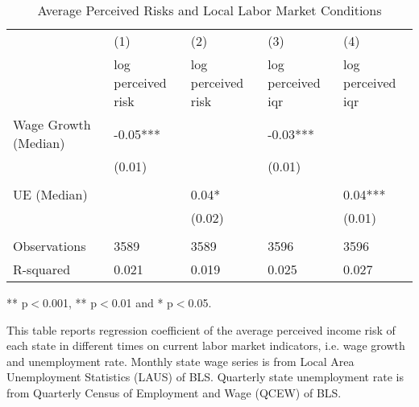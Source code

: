 	
	\begin{table}[ht]
		\centering
		\begin{adjustbox}{width=0.9\textwidth}
			\begin{threeparttable}
			\caption{Average Perceived Risks and Local Labor Market Conditions}
			\label{macro_corr_he_state}
			\begin{tabular}{lllll}
					\hline 
				& (1)                & (2)                & (3)               & (4)               \\
				& log perceived risk & log perceived risk & log perceived iqr & log perceived iqr \\
				\hline 
				Wage Growth (Median) & -0.05***           &                    & -0.03***          &                   \\
				& (0.01)             &                    & (0.01)            &                   \\
				&                    &                    &                   &                   \\
				UE (Median)          &                    & 0.04*              &                   & 0.04***           \\
				&                    & (0.02)             &                   & (0.01)            \\
				&                    &                    &                   &                   \\
					\hline 
				Observations         & 3589               & 3589               & 3596              & 3596              \\
				R-squared            & 0.021              & 0.019              & 0.025             & 0.027             \\
				\hline      
			\end{tabular}

				\begin{flushleft}
					\item *** p$<$0.001, ** p$<$0.01 and * p$<$0.05.
					\item This table reports regression coefficient of the average perceived income risk of each state in different times on current labor market indicators, i.e. wage growth and unemployment rate. Monthly state wage series is from Local Area Unemployment Statistics (LAUS) of BLS. Quarterly state unemployment rate is from Quarterly Census of Employment and Wage (QCEW) of BLS. 
				\end{flushleft}
			\end{threeparttable}
		\end{adjustbox}
	\end{table}


